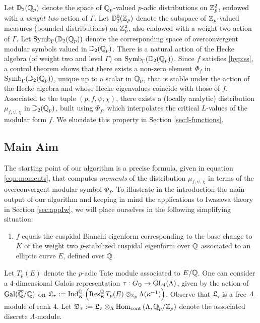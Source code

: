 \documentclass[a4paper,11pt]{article}
\DeclareMathOperator{\Gal}{Gal}
\numberwithin{equation}{section}
\newcommand{\Galois}[2]{\Gal({#1}/{#2})}
\newcommand{\GL}{\mathrm{GL}}
\newcommand{\Ind}{\mathrm{Ind}}
\newcommand{\Res}{\mathrm{Res}}
\newcommand{\LLL}{\mathfrak{L}}
\newcommand{\DDD}{\mathfrak{D}}
\begin{document}
Let $\mathbb{D}_2(\mathbb{Q}_p)$ denote the space of $\mathbb{Q}_p$-valued $p$-adic distributions on $\mathbb{Z}_p^2$, endowed with a \textit{weight two} action of $\Gamma$. Let $\mathbb{D}_2^0(\mathbb{Z}_p)$ denote the subspace of $\mathbb{Z}_p$-valued measures (bounded distributions) on $\mathbb{Z}_p^2$, also endowed with a weight two action of $\Gamma$. Let $\mathrm{Symb}_\Gamma(\mathbb{D}_2(\mathbb{Q}_p))$ denote the corresponding space of overconvergent modular symbols valued in $\mathbb{D}_2(\mathbb{Q}_p)$. There is a natural action of the Hecke algebra (of weight two and level $\Gamma$) on $\mathrm{Symb}_\Gamma(\mathbb{D}_2(\mathbb{Q}_p))$. Since $f$ satisfies \ref{hyp:ss},  a control theorem \cite[Thm.~6.10]{Wil17} shows that there exists a non-zero element $\Phi_f$ in $\mathrm{Symb}_\Gamma(\mathbb{D}_2(\mathbb{Q}_p))$, unique up to a scalar in $\mathbb{Q}_p$, that is stable under the action of the Hecke algebra and whose Hecke eigenvalues coincide with those of $f$. Associated to the tuple $(p,f,\psi,\chi)$, there exists a (locally analytic) distribution ${\mu}_{f,\psi,\chi}$ in $\mathbb{D}_2(\mathbb{Q}_p)$, built using $\Phi_f$, which interpolates the critical $L$-values of the modular form $f$. We elucidate this property in Section \ref{sec:l-functions}.


\subsection{Main Aim}  The starting point of our algorithm is a precise formula, given in equation \eqref{eqn:moments}, that computes \textit{moments} of the distribution ${\mu}_{f,\psi,\chi}$ in terms of the overconvergent modular symbol $\Phi_f$. To illustrate in the introduction the main output of our algorithm and keeping in mind the applications to Iwasawa theory in Section \ref{sec:appIw}, we will place ourselves in the following simplifying situation:

\begin{enumerate}[style=sameline, style=sameline, align=left,label=(\textsc{Base-Change}) --- , ref=(\textsc{Base-Change})]
\item\label{hyp:basechange}  $f$ equals the cuspidal Bianchi eigenform corresponding to the base change to $K$ of the weight two $p$-stabilized cuspidal eigenform over $\mathbb{Q}$ associated to an elliptic curve $E$, defined over $\mathbb{Q}$.
\end{enumerate}

Let $T_p(E)$ denote the $p$-adic Tate module associated to $E/\mathbb{Q}$. One can consider a $4$-dimensional Galois representation $\tau:G_\Q \rightarrow \GL_4(\Lambda)$, given by the action of $\Galois{\overline{\Q}}{\Q}$ on $\LLL_\tau:= \Ind^\Q_K \left( \Res^\Q_K T_p(E) \otimes_{\Z_p} \Lambda(\kappa^{-1})\right)$. Observe that $\LLL_\tau$ is a free $\Lambda$-module of rank $4$. Let $\DDD_\tau:=\LLL_\tau \otimes_\Lambda \Hom_{\mathrm{cont}}\left(\Lambda,\Q_p/\Z_p\right)$ denote the associated discrete $\Lambda$-module.
\end{document}
